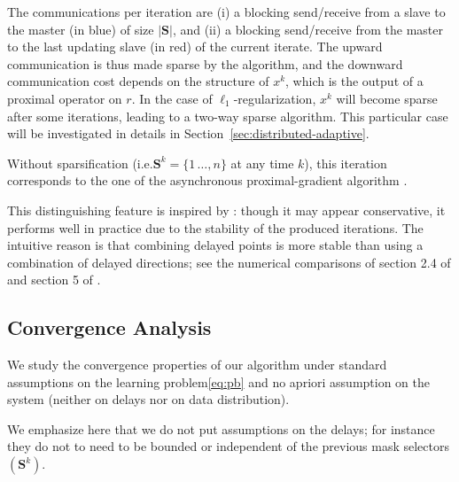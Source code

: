The communications per iteration are (i) a blocking {\color{blue!70!black}send/receive} from a slave to the master (in {\color{blue!70!black}blue}) of size $|\mathbf{S}|$, and (ii) a blocking {\color{red!80!yellow}send/receive} from the master to the last updating slave (in {\color{red!80!yellow}red}) of the current iterate.
The upward communication is thus made sparse by the algorithm, and the downward communication cost depends on the structure of $x^k$, which is the output of a proximal operator on $r$. In the case of $\ell_1$-regularization, $x^k$ will become sparse after some iterations, leading to a two-way sparse algorithm. This particular case will be investigated in details in Section~\ref{sec:distributed-adaptive}. 



Without sparsification (i.e.\;$\mathbf{S}^{k}= \{1\,\ldots,n\}$ at any time $k$), this iteration corresponds to the one of the asynchronous proximal-gradient algorithm \dave \cite{ICML18}.


This distinguishing feature is inspired by \dave \cite{mishchenko2018}: though it may appear conservative, it performs well in practice due to the stability of the produced iterations. The intuitive reason is that combining delayed points is more stable than using a combination of delayed directions; see the numerical comparisons of section 2.4 of \cite{mishchenko2018} and section 5 of \cite{ICML18}. 



\subsection{Convergence Analysis}\label{sec:distributed-sparse-analyze}

We study the convergence properties of our algorithm under standard assumptions on the learning problem\;\eqref{eq:pb} and no apriori assumption on the system (neither on delays nor on data distribution).






We emphasize here that we do not put assumptions on the delays; for instance they do not to need to be bounded or independent of the previous mask selectors $(\mathbf{S}^k)$. 

